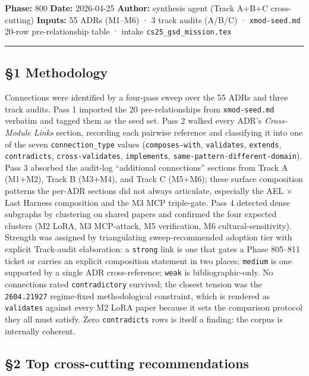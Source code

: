 \documentclass[11pt,letterpaper]{article}
\newcommand{\arxivid}[1]{\texttt{\textcolor{accent}{#1}}}
\begin{document}
\textbf{Phase:} 800 \textbf{Date:} 2026-04-25 \textbf{Author:} synthesis
agent (Track A+B+C cross-cutting) \textbf{Inputs:} 55 ADRs (M1--M6) · 3
track audits (A/B/C) · \texttt{xmod-seed.md} 20-row pre-relationship
table · intake \texttt{cs25\_gsd\_mission.tex}

\begin{center}\rule{0.5\linewidth}{0.5pt}\end{center}

\subsection{§1 Methodology}

Connections were identified by a four-pass sweep over the 55 ADRs and
three track audits. Pass 1 imported the 20 pre-relationships from
\texttt{xmod-seed.md} verbatim and tagged them as the seed set. Pass 2
walked every ADR's \emph{Cross-Module Links} section, recording each
pairwise reference and classifying it into one of the seven
\texttt{connection\_type} values (\texttt{composes-with},
\texttt{validates}, \texttt{extends}, \texttt{contradicts},
\texttt{cross-validates}, \texttt{implements},
\texttt{same-pattern-different-domain}). Pass 3 absorbed the audit-log
``additional connections'' sections from Track A (M1+M2), Track B
(M3+M4), and Track C (M5+M6); these surface composition patterns the
per-ADR sections did not always articulate, especially the AEL × Last
Harness composition and the M3 MCP triple-gate. Pass 4 detected dense
subgraphs by clustering on shared papers and confirmed the four expected
clusters (M2 LoRA, M3 MCP-attack, M5 verification, M6
cultural-sensitivity). Strength was assigned by triangulating
sweep-recommended adoption tier with explicit Track-audit elaboration: a
\texttt{strong} link is one that gates a Phase 805--811 ticket or
carries an explicit composition statement in two places; \texttt{medium}
is one supported by a single ADR cross-reference; \texttt{weak} is
bibliographic-only. No connections rated \texttt{contradictory}
survived; the closest tension was the \arxivid{2604.21927} regime-fixed
methodological constraint, which is rendered as \texttt{validates}
against every M2 LoRA paper because it sets the comparison protocol they
all must satisfy. Zero \texttt{contradicts} rows is itself a finding:
the corpus is internally coherent.

\subsection{§2 Top cross-cutting
recommendations}
\end{document}

